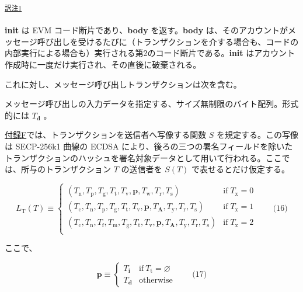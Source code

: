 \documentclass[
]{ltjsarticle}
\providecommand{\tightlist}{%
  \setlength{\itemsep}{0pt}\setlength{\parskip}{0pt}}
\begin{document}
\protect\hypertarget{tnref-1}{}{}\textsuperscript{\protect\hyperlink{tn-1}{訳注1}}

\textbf{init} は EVM コード断片であり、\textbf{body}
を返す。\textbf{body}
は、そのアカウントがメッセージ呼び出しを受けるたびに（トランザクションを介する場合も、コードの内部実行による場合も）実行される第2のコード断片である。\textbf{init}
はアカウント作成時に一度だけ実行され、その直後に破棄される。

これに対し、メッセージ呼び出しトランザクションは次を含む。

\begin{description}
\tightlist
\item[data]
メッセージ呼び出しの入力データを指定する、サイズ無制限のバイト配列。形式的には
\(T_{\mathbf{d}}\) 。
\end{description}

\protect\hyperlink{app:signing}{付録F}では、トランザクションを送信者へ写像する関数
\(S\) を規定する。この写像は SECP-256k1 曲線の ECDSA
により、後ろの三つの署名フィールドを除いたトランザクションのハッシュを署名対象データとして用いて行われる。ここでは、所与のトランザクション
\(T\) の送信者を \(S(T)\) で表せるとだけ仮定する。

\protect\hypertarget{eq-16}{}{}

\[L_{\mathrm{T}}(T) \equiv \begin{cases}
(T_{\mathrm{n}}, T_{\mathrm{p}}, T_{\mathrm{g}}, T_{\mathrm{t}}, T_{\mathrm{v}}, \mathbf{p}, T_{\mathrm{w}}, T_{\mathrm{r}}, T_{\mathrm{s}}) & \text{if} \; T_{\mathrm{x}} = 0 \\
(T_{\mathrm{c}}, T_{\mathrm{n}}, T_{\mathrm{p}}, T_{\mathrm{g}}, T_{\mathrm{t}}, T_{\mathrm{v}}, \mathbf{p}, T_{\mathbf{A}}, T_{\mathrm{y}}, T_{\mathrm{r}}, T_{\mathrm{s}}) & \text{if} \; T_{\mathrm{x}} = 1 \\
(T_{\mathrm{c}}, T_{\mathrm{n}}, T_{\mathrm{f}}, T_{\mathrm{m}}, T_{\mathrm{g}}, T_{\mathrm{t}}, T_{\mathrm{v}}, \mathbf{p}, T_{\mathbf{A}}, T_{\mathrm{y}}, T_{\mathrm{r}}, T_{\mathrm{s}}) & \text{if} \; T_{\mathrm{x}} = 2 \\
\end{cases} \qquad \text{(16)}\]

ここで、

\protect\hypertarget{eq-17}{}{}

\[\mathbf{p} \equiv \begin{cases}
T_{\mathbf{i}} & \text{if}\ T_{\mathrm{t}} = \varnothing \\
T_{\mathbf{d}} & \text{otherwise}
\end{cases} \qquad \text{(17)}\]
\end{document}
